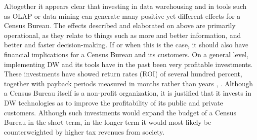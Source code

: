 Altogether it appears clear that investing in data warehousing and in tools such as OLAP or data mining can generate many positive yet 
different effects for a Census Bureau. 
The effects described and elaborated on above are primarily operational, as they relate to things such as more and better information,
and better and faster decision-making. 
If or when this is the case, it should also have financial implications for a Census Bureau and its customers.
On a general level, implementing DW and its tools have in the past been very profitable investments. 
These investments have showed return rates (ROI) of several hundred percent,
together with payback periods measured in months rather than years \cite[chapter~31.1.3]{CourseLitt}, \cite{l2video}. 
Although a Census Bureau itself is a non-profit organization, 
it is justified that it invests in DW technologies as to improve the profitability of its public and private customers. 
Although such investments would expand the budget of a Census Bureau in the short term, 
in the longer term it would most likely be counterweighted by higher tax revenues from society.